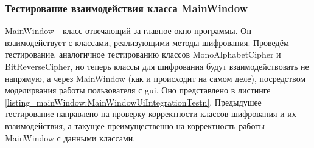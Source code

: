 \documentclass[a4paper,12pt]{article}
\begin{document}
\newpage\subsubsection{Тестирование взаимодействия класса MainWindow}
MainWindow - класс отвечающий за главное окно программы. Он взаимодействует с классами, реализующими методы шифрования. Проведём тестирование, аналогичное тестированию классов MonoAlphabetCipher и BitReverseCipher, но теперь классы для шифрования будут взаимодействовать не напрямую, а через MainWindow (как и происходит на самом деле), посредством моделирвания работы пользователя с gui. Оно представлено в листинге \ref{listing_mainWindow:MainWindowUiIntegrationTestn}. Предыдушее тестирование направлено на проверку корректности классов шифрования и их взаимодействия, а такущее преимущественно на корректность работы MainWindow с данными классами.
\end{document}

